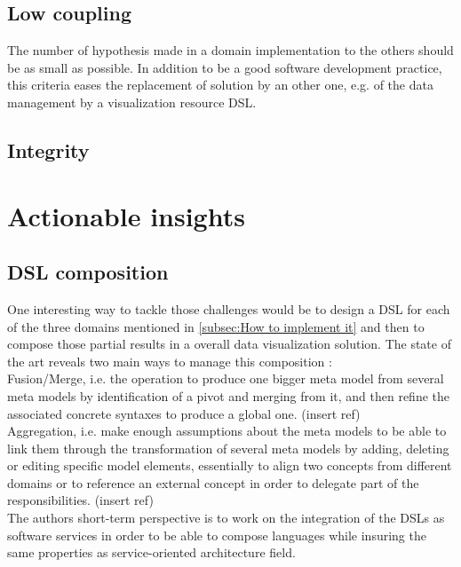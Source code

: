 \documentclass{acm_proc_article-sp}
\begin{document}
\subsection{Low coupling}
The number of hypothesis made in a domain implementation to the others should be
as small as possible. In addition to be a good software development practice,
this criteria eases the replacement of solution by an other one, e.g. of the
data management by a visualization resource DSL.

\subsection{Integrity}

\section{Actionable insights}
\subsection{DSL composition}
One interesting way to tackle those challenges would be to design a DSL for each
of the three domains mentioned in \ref{subsec:How to implement it} and then to
compose those partial results in a overall data visualization solution.
The state of the art reveals two main ways to manage this composition :\\
 Fusion/Merge, i.e. the operation to produce one bigger meta model
from several meta models by identification of a pivot and merging from it, and
then refine the associated concrete syntaxes to produce a global one. (insert ref)\\
 Aggregation, i.e. make enough assumptions about the meta models to be able to link them through the transformation of several meta models by adding, deleting or editing specific model elements, essentially to align two concepts from different domains or to reference an external concept in order to delegate part of the responsibilities. (insert ref)\\
The authors short-term perspective is to work on the integration of the DSLs as software services in order to be able to compose languages while insuring the same properties as service-oriented architecture field.




%
\end{document}

